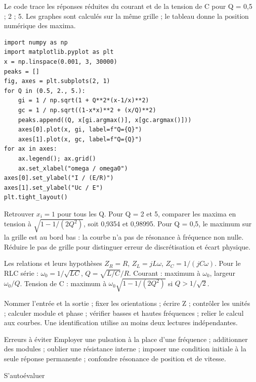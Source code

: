 Le code trace les réponses réduites du courant et de la tension de C pour Q = 0,5 ; 2 ; 5. Les graphes sont calculés sur la même grille ; le tableau donne la position numérique des maxima.
\begin{verbatim}
import numpy as np
import matplotlib.pyplot as plt
x = np.linspace(0.001, 3, 30000)
peaks = []
fig, axes = plt.subplots(2, 1)
for Q in (0.5, 2., 5.):
    gi = 1 / np.sqrt(1 + Q**2*(x-1/x)**2)
    gc = 1 / np.sqrt((1-x*x)**2 + (x/Q)**2)
    peaks.append((Q, x[gi.argmax()], x[gc.argmax()]))
    axes[0].plot(x, gi, label=f"Q={Q}")
    axes[1].plot(x, gc, label=f"Q={Q}")
for ax in axes:
    ax.legend(); ax.grid()
    ax.set_xlabel("omega / omega0")
axes[0].set_ylabel("I / (E/R)")
axes[1].set_ylabel("Uc / E")
plt.tight_layout()
\end{verbatim}
Retrouver $x_i=1$ pour tous les Q. Pour Q = 2 et 5, comparer les maxima en tension à $\sqrt{1-1/(2Q^2)}$, soit 0,9354 et 0,98995. Pour Q = 0,5, le maximum sur la grille est au bord bas : la courbe n’a pas de résonance à fréquence non nulle. Réduire le pas de grille pour distinguer erreur de discrétisation et écart physique.


\begin{loi}{Les relations et leurs hypothèses}
$Z_R=R$, $Z_L=jL\omega$, $Z_C=1/(jC\omega)$. Pour le RLC série : $\omega_0=1/\sqrt{LC}$, $Q=\sqrt{L/C}/R$. Courant : maximum à $\omega_0$, largeur $\omega_0/Q$. Tension de C : maximum à $\omega_0\sqrt{1-1/(2Q^2)}$ si $Q>1/\sqrt2$.
\end{loi}
Nommer l’entrée et la sortie ; fixer les orientations ; écrire Z ; contrôler les unités ; calculer module et phase ; vérifier basses et hautes fréquences ; relier le calcul aux courbes. Une identification utilise au moins deux lectures indépendantes.
\begin{piege}{Erreurs à éviter}
Employer une pulsation à la place d’une fréquence ; additionner des modules ; oublier une résistance interne ; imposer une condition initiale à la seule réponse permanente ; confondre résonance de position et de vitesse.
\end{piege}
\begin{docu}{S’autoévaluer}
\end{docu}


